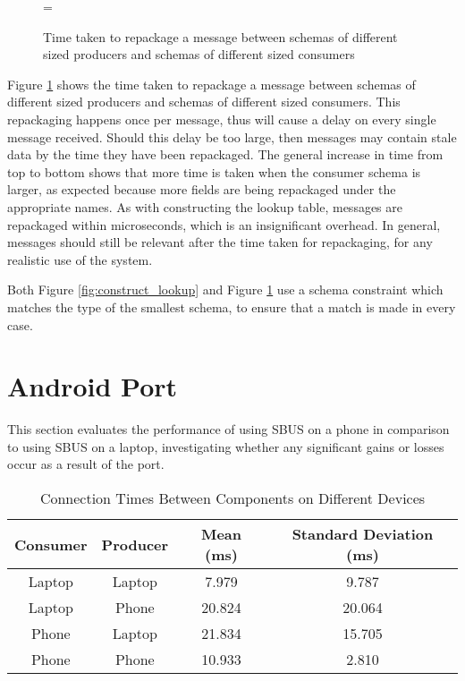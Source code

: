 \documentclass[12pt,twoside,notitlepage]{report}
\begin{document}
\begin{figure}[t]
\epsfxsize=\hsize
\centerline{}
\caption[Repackage Message]{Time taken to repackage a message between schemas of different sized producers and schemas of different sized consumers}
\label{fig:repack_message}
\end{figure}

Figure \ref{fig:repack_message} shows the time taken to repackage a message between schemas of different sized producers and schemas of different sized consumers. 
This repackaging happens once per message, thus will cause a delay on every single message received. 
Should this delay be too large, then messages may contain stale data by the time they have been repackaged. 
The general increase in time from top to bottom shows that more time is taken when the consumer schema is larger, as expected because more fields are being repackaged under the appropriate names. 
As with constructing the lookup table, messages are repackaged within microseconds, which is an insignificant overhead. 
In general, messages should still be relevant after the time taken for repackaging, for any realistic use of the system.

Both Figure \ref{fig:construct_lookup} and Figure \ref{fig:repack_message} use a schema constraint which matches the type of the smallest schema, to ensure that a match is made in every case. 

\section{Android Port}

This section evaluates the performance of using SBUS on a phone in comparison to using SBUS on a laptop, investigating whether any significant gains or losses occur as a result of the port.

\begin{table}[h]
\centering

\begin{tabular}{c c c c}
\hline\hline

Consumer & Producer & Mean (ms) & Standard Deviation (ms) \\
\hline

Laptop	&	Laptop	& 7.979 	& 9.787 \\
Laptop	&	Phone	& 20.824 	& 20.064 \\
Phone	&	Laptop	& 21.834	& 15.705 \\
Phone	& 	Phone	& 10.933	& 2.810 \\
\hline
\end{tabular}

\caption{Connection Times Between Components on Different Devices}
\label{tab:map_times}
\end{table}
\end{document}
